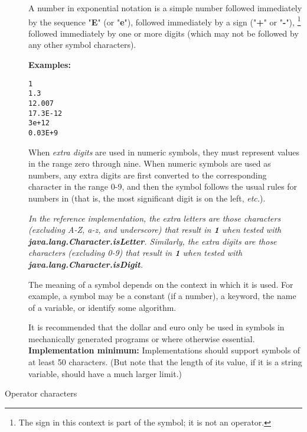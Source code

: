 \begin{description}
A number in exponential notation is a simple number followed immediately
by the sequence "\textbf{E}" (or "\textbf{e}"), followed
immediately by a sign ("\textbf{+}" or "\textbf{-}"),
\footnote{
The sign in this context is part of the symbol; it is not an
operator.
}
followed immediately by one or more digits (which may not be followed by
any other symbol characters).
 
\textbf{Examples:}
\begin{alltt}
1
1.3
12.007
17.3E-12
3e+12
0.03E+9
\end{alltt}
 
When \emph{extra digits} are used in numeric symbols, they must
represent values in the range zero through nine.
When numeric symbols are used as numbers, any extra digits are first
converted to the corresponding character in the range 0-9, and then the
symbol follows the usual rules for numbers in \nr{} (that is, the most
significant digit is on the left, \emph{etc.}).
 
\emph{In the reference implementation, the extra letters are those
characters (excluding A-Z, a-z, and underscore) that result
in \textbf{1} when tested with \textbf{java.lang.Character.isLetter}.
Similarly, the extra digits are those characters (excluding 0-9) that
result in \textbf{1} when tested with \textbf{java.lang.Character.isDigit}.
}
 
The meaning of a symbol depends on the context in which it is used.
For example, a symbol may be a constant (if a number), a keyword, the
name of a variable, or identify some algorithm.
 
It is recommended that the dollar and euro only be used in symbols in
mechanically generated programs or where otherwise essential.
 \textbf{Implementation minimum:} Implementations should support
symbols of at least 50 characters.
(But note that the length of its value, if it is a string variable,
should have a much larger limit.)
\item[Operator characters]\label{refopers}


\end{description}
